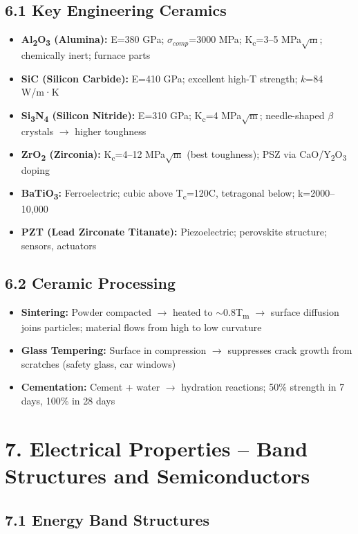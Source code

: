 \documentclass[11pt,a4paper]{article}
\newcommand{\mysec}[1]{\section*{#1}}
\newcommand{\mysubsec}[1]{\subsection*{#1}}
\newcommand{\KEY}[1]{\textcolor{SecondaryDark}{\textbf{#1}}}
\begin{document}
\mysubsec{6.1 Key Engineering Ceramics}
\begin{itemize}[leftmargin=*,nosep]
    \item \KEY{Al\textsubscript{2}O\textsubscript{3} (Alumina):} E=380 GPa; $\sigma_{comp}$=3000 MPa; K\textsubscript{c}=3--5 MPa$\sqrt{\text{m}}$; chemically inert; furnace parts
    \item \KEY{SiC (Silicon Carbide):} E=410 GPa; excellent high-T strength; $k$=84 W/m·K
    \item \KEY{Si\textsubscript{3}N\textsubscript{4} (Silicon Nitride):} E=310 GPa; K\textsubscript{c}=4 MPa$\sqrt{\text{m}}$; needle-shaped $\beta$ crystals $\to$ higher toughness
    \item \KEY{ZrO\textsubscript{2} (Zirconia):} K\textsubscript{c}=4--12 MPa$\sqrt{\text{m}}$ (best toughness); PSZ via CaO/Y\textsubscript{2}O\textsubscript{3} doping
    \item \KEY{BaTiO\textsubscript{3}:} Ferroelectric; cubic above T\textsubscript{c}=120\textdegree C, tetragonal below; k=2000--10,000
    \item \KEY{PZT (Lead Zirconate Titanate):} Piezoelectric; perovskite structure; sensors, actuators
\end{itemize}

\mysubsec{6.2 Ceramic Processing}
\begin{itemize}[leftmargin=*,nosep]
    \item \KEY{Sintering:} Powder compacted $\to$ heated to $\sim$0.8T\textsubscript{m} $\to$ surface diffusion joins particles; material flows from high to low curvature
    \item \KEY{Glass Tempering:} Surface in compression $\to$ suppresses crack growth from scratches (safety glass, car windows)
    \item \KEY{Cementation:} Cement + water $\to$ hydration reactions; 50\% strength in 7 days, 100\% in 28 days
\end{itemize}

\newpage
\mysec{7. Electrical Properties -- Band Structures and Semiconductors}

\mysubsec{7.1 Energy Band Structures}
\end{document}

